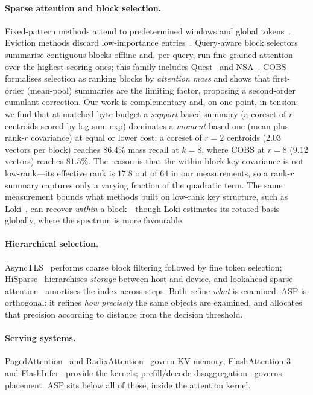 \documentclass[sigconf,nonacm,11pt]{acmart}
\begin{document}
\paragraph{Sparse attention and block selection.} Fixed-pattern methods attend
to predetermined windows and global tokens~\cite{beltagy2020longformer,%
zaheer2020bigbird}. Eviction methods discard low-importance
entries~\cite{xiao2024streamingllm,zhang2023h2o,li2024snapkv}. Query-aware block
selectors summarise contiguous blocks offline and, per query, run fine-grained
attention over the highest-scoring ones; this family includes
Quest~\cite{tang2024quest} and NSA~\cite{yuan2025nsa}. COBS~\cite{tian2026cobs}
formalises selection as ranking blocks by \emph{attention mass} and shows that
first-order (mean-pool) summaries are the limiting factor, proposing a
second-order cumulant correction. Our work is complementary and, on one point,
in tension: we find that at matched byte budget a \emph{support}-based summary
(a coreset of $r$ centroids scored by log-sum-exp) dominates a \emph{moment}-based
one (mean plus rank-$r$ covariance) at equal or lower cost: a coreset of $r=2$
centroids ($2.03$ vectors per block) reaches $86.4\%$ mass recall at $k=8$, where
COBS at $r=8$ ($9.12$ vectors) reaches $81.5\%$. The reason is that the
within-block key covariance is not low-rank---its effective rank is $17.8$ out of $64$ in our measurements, so
a rank-$r$ summary captures only a varying fraction of the quadratic term. The
same measurement bounds what methods built on low-rank key structure, such as
Loki~\cite{singhania2024loki}, can recover \emph{within} a block---though Loki
estimates its rotated basis globally, where the spectrum is more favourable.

\paragraph{Hierarchical selection.} AsyncTLS~\cite{hu2026asynctls} performs
coarse block filtering followed by fine token selection;
HiSparse~\cite{hisparse2026} hierarchises \emph{storage} between host and device,
and lookahead sparse attention~\cite{lsa2026} amortises the index across steps.
Both refine \emph{what} is examined. ASP is orthogonal: it refines \emph{how
precisely} the same objects are examined, and allocates that precision according
to distance from the decision threshold.

\paragraph{Serving systems.} PagedAttention~\cite{kwon2023vllm} and
RadixAttention~\cite{zheng2024sglang} govern KV memory;
FlashAttention-3~\cite{shah2024flashattention3} and
FlashInfer~\cite{ye2025flashinfer} provide the kernels; prefill/decode
disaggregation~\cite{zhong2024distserve,qin2024mooncake,agrawal2024sarathi}
governs placement. ASP sits below all of these, inside the attention kernel.
\end{document}
